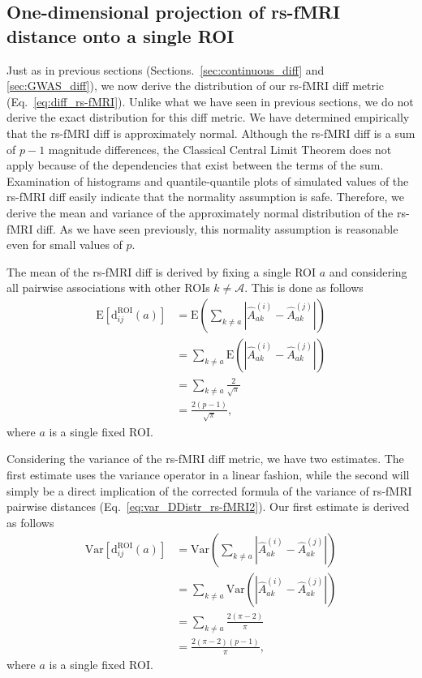 \documentclass[aoas]{imsart}
\begin{document}
\subsection{One-dimensional projection of rs-fMRI distance onto a single ROI}\label{sec:rs-fMRI_diff}

Just as in previous sections (Sections.~\ref{sec:continuous_diff} and \ref{sec:GWAS_diff}), we now derive the distribution of our rs-fMRI diff metric (Eq.~\ref{eq:diff_rs-fMRI}). Unlike what we have seen in previous sections, we do not derive the exact distribution for this diff metric. We have determined empirically that the rs-fMRI diff is approximately normal. Although the rs-fMRI diff is a sum of $p-1$ magnitude differences, the Classical Central Limit Theorem does not apply because of the dependencies that exist between the terms of the sum. Examination of histograms and quantile-quantile plots of simulated values of the rs-fMRI diff easily indicate that the normality assumption is safe. Therefore, we derive the mean and variance of the approximately normal distribution of the rs-fMRI diff. As we have seen previously, this normality assumption is reasonable even for small values of $p$. 

The mean of the rs-fMRI diff is derived by fixing a single ROI $a$ and considering all pairwise associations with other ROIs $k \neq \mathcal{A}$. This is done as follows
%
\begin{equation}\label{eq:rs-fMRI_diffMean}
\begin{aligned}
\text{E}\left[\text{d}^\text{ROI}_{ij}(a)\right] &= \text{E}\left(\sum_{k \neq a} \left|\hat{A}^{(i)}_{ak} - \hat{A}^{(j)}_{ak}\right|\right) \\
&= \sum_{k \neq a} \text{E}\left(\left|\hat{A}^{(i)}_{ak} - \hat{A}^{(j)}_{ak}\right|\right) \\
&= \sum_{k \neq a} \frac{2}{\sqrt{\pi}} \\
&= \frac{2(p-1)}{\sqrt{\pi}},
\end{aligned}
\end{equation}
% 
where $a$ is a single fixed ROI.

Considering the variance of the rs-fMRI diff metric, we have two estimates. The first estimate uses the variance operator in a linear fashion, while the second will simply be a direct implication of the corrected formula of the variance of rs-fMRI pairwise distances (Eq.~\ref{eq:var_DDistr_rs-fMRI2}). Our first estimate is derived as follows
%
\begin{equation}\label{eq:rs-fMRI_diffVar1}
\begin{aligned}
\text{Var}\left[\text{d}^\text{ROI}_{ij}(a)\right] &= \text{Var}\left(\sum_{k \neq a} \left|\hat{A}^{(i)}_{ak} - \hat{A}^{(j)}_{ak}\right|\right) \\
&= \sum_{k \neq a} \text{Var}\left(\left|\hat{A}^{(i)}_{ak} - \hat{A}^{(j)}_{ak}\right|\right) \\
&= \sum_{k \neq a} \frac{2(\pi - 2)}{\pi} \\
&= \frac{2(\pi - 2)(p-1)}{\pi},
\end{aligned}
\end{equation}
%
where $a$ is a single fixed ROI.
\end{document}
